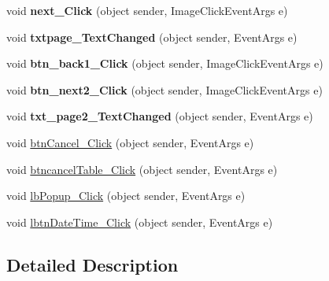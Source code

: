 \begin{DoxyCompactItemize}
\item 
\hypertarget{classusertrackmyhealth__fitness_a2716f7066dec1b11aa719a4273f9922e}{void {\bfseries next\-\_\-\-Click} (object sender, Image\-Click\-Event\-Args e)}\label{classusertrackmyhealth__fitness_a2716f7066dec1b11aa719a4273f9922e}

\item 
\hypertarget{classusertrackmyhealth__fitness_af9c5cb01f3ec9fbaf36c4cf1697865e7}{void {\bfseries txtpage\-\_\-\-Text\-Changed} (object sender, Event\-Args e)}\label{classusertrackmyhealth__fitness_af9c5cb01f3ec9fbaf36c4cf1697865e7}

\item 
\hypertarget{classusertrackmyhealth__fitness_a0e998c5138057a5620f0fe5f632d9d6d}{void {\bfseries btn\-\_\-back1\-\_\-\-Click} (object sender, Image\-Click\-Event\-Args e)}\label{classusertrackmyhealth__fitness_a0e998c5138057a5620f0fe5f632d9d6d}

\item 
\hypertarget{classusertrackmyhealth__fitness_a0e709011831c3137c6ad322f488b5b1e}{void {\bfseries btn\-\_\-next2\-\_\-\-Click} (object sender, Image\-Click\-Event\-Args e)}\label{classusertrackmyhealth__fitness_a0e709011831c3137c6ad322f488b5b1e}

\item 
\hypertarget{classusertrackmyhealth__fitness_aface09f2245bee35bf428810ddd0d5e5}{void {\bfseries txt\-\_\-page2\-\_\-\-Text\-Changed} (object sender, Event\-Args e)}\label{classusertrackmyhealth__fitness_aface09f2245bee35bf428810ddd0d5e5}

\item 
void \hyperlink{classusertrackmyhealth__fitness_a32bfa30253bb66a6a7adae759d39fdbb}{btn\-Cancel\-\_\-\-Click} (object sender, Event\-Args e)
\item 
void \hyperlink{classusertrackmyhealth__fitness_a6266c96f7767020e93a5ba8f0c7b9c8f}{btncancel\-Table\-\_\-\-Click} (object sender, Event\-Args e)
\item 
void \hyperlink{classusertrackmyhealth__fitness_aa7d526920fed6d27f8e7471486b66b4b}{lb\-Popup\-\_\-\-Click} (object sender, Event\-Args e)
\item 
void \hyperlink{classusertrackmyhealth__fitness_ae02dc8e1676eacb33c83f1a7022809c5}{lbtn\-Date\-Time\-\_\-\-Click} (object sender, Event\-Args e)
\end{DoxyCompactItemize}


\subsection{Detailed Description}


